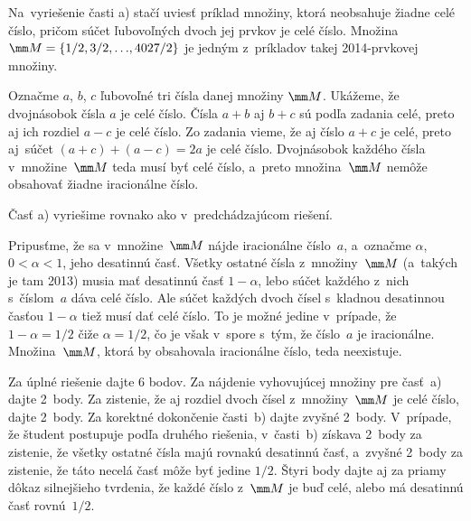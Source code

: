 {%
Na~vyriešenie časti a) stačí uviesť príklad množiny, ktorá neobsahuje žiadne celé číslo,
pričom súčet ľubovoľných dvoch jej prvkov je celé číslo.
Množina $\mm M = \{1/2, 3/2,{\dots}, 4027/2\}$ je
jedným z~príkladov takej 2014-prvkovej množiny.

Označme $a$, $b$, $c$ ľubovoľné tri čísla danej množiny $\mm M$.
Ukážeme, že dvojnásobok čísla $a$ je celé číslo. Čísla $a + b$
aj $b + c$ sú podľa zadania celé, preto aj ich rozdiel $a-c$ je celé
číslo. Zo zadania vieme, že aj číslo $a + c$ je celé, preto
aj~súčet $(a + c)+(a-c)=2a$ je celé číslo. Dvojnásobok každého
čísla v~množine~$\mm M$ teda musí byť celé číslo, a~preto množina~$\mm M$
nemôže obsahovať žiadne iracionálne číslo.

\ineriesenie
Časť a) vyriešime rovnako ako v~predchádzajúcom riešení.

Pripusťme, že sa v~množine~$\mm M$ nájde iracionálne číslo~$a$, a~označme $\alpha$, $0<\alpha<1$,
jeho desatinnú časť. Všetky ostatné čísla z~množiny~$\mm M$ (a~takých je tam 2013)
musia mať desatinnú časť $1-\alpha$, lebo súčet každého z~nich s~číslom~$a$ dáva celé číslo.
Ale súčet každých dvoch čísel s~kladnou desatinnou časťou $1-\alpha$ tiež musí dať celé číslo.
To je možné jedine v~prípade, že $1-\alpha=1/2$ čiže $\alpha=1/2$, čo je však v~spore s~tým,
že číslo~$a$ je iracionálne.
Množina~$\mm M$, ktorá by obsahovala iracionálne číslo, teda neexistuje.



\nobreak\medskip\petit\noindent
Za úplné riešenie dajte 6 bodov.
Za nájdenie vyhovujúcej množiny pre časť~a) dajte 2~body. Za
zistenie, že aj rozdiel dvoch čísel z~množiny~$\mm M$ je celé číslo,
dajte 2~body. Za korektné dokončenie časti~b) dajte zvyšné 2~body.
V~prípade, že študent postupuje podľa druhého riešenia, v~časti~b)
získava 2~body za zistenie, že všetky ostatné čísla majú
rovnakú desatinnú časť, a~zvyšné 2~body za zistenie, že táto
necelá časť môže byť jedine $1/2$.
Štyri body dajte aj za priamy dôkaz silnejšieho tvrdenia, že každé číslo z~$\mm M$
je buď celé, alebo má desatinnú časť rovnú~$1/2$.
\endpetit
\bigbreak
}


